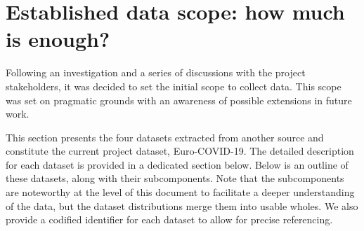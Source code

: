 \section{Established data scope: how much is enough?}


Following an investigation and a series of discussions with the project stakeholders, it was decided to set the initial scope to collect data. This scope was set on pragmatic grounds with an awareness of possible extensions in future work.

This section presents the four datasets extracted from another source and constitute the current project dataset, Euro-COVID-19. The detailed description for each dataset is provided in a dedicated section below. Below is an outline of these datasets, along with their subcomponents. Note that the subcomponents are noteworthy at the level of this document to facilitate a deeper understanding of the data, but the dataset distributions merge them into usable wholes. We also provide a codified identifier for each dataset to allow for precise referencing. 

